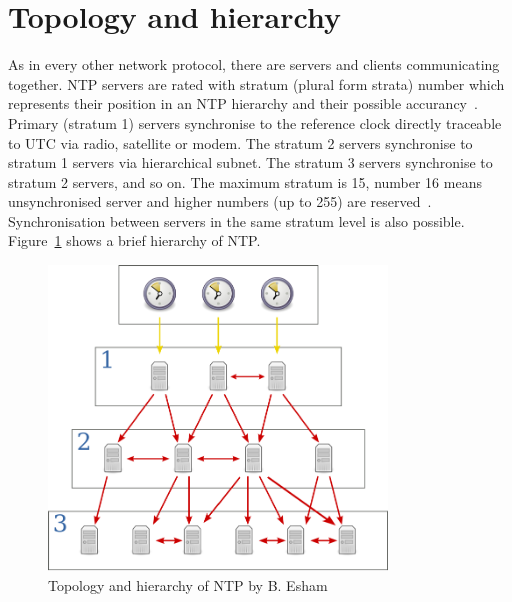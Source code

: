 
\section{Topology and hierarchy}
As in every other network protocol, there are servers and clients communicating together.
NTP servers are rated with stratum (plural form strata) number which represents their position
in an NTP hierarchy and their possible accurancy~\cite{rfc5905}.
Primary (stratum 1) servers synchronise to the reference clock directly traceable to UTC via
radio, satellite or modem.
The stratum 2 servers synchronise to stratum 1
servers via hierarchical subnet.
The stratum 3 servers synchronise to stratum 2 servers, and so on.
The maximum stratum is 15, number 16 means unsynchronised server
and higher numbers (up to 255) are reserved~\cite{rfc5905}.
Synchronisation between servers in the same stratum level is also possible.
Figure~\ref{fig:ntp-hierarchy} shows a brief hierarchy of NTP.
\begin{figure}
  \centering
  \includegraphics[width=9cm,keepaspectratio]{fig/Network_Time_Protocol_servers_and_clients.pdf}
  \caption{Topology and hierarchy of NTP by B. Esham}
  \label{fig:ntp-hierarchy}
  \bigskip
\end{figure}
